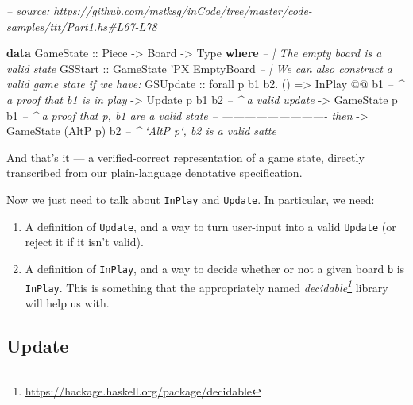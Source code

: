 \documentclass[]{article}
\newenvironment{Shaded}{}{}
\newcommand{\CommentTok}[1]{\textcolor[rgb]{0.38,0.63,0.69}{\textit{#1}}}
\newcommand{\DataTypeTok}[1]{\textcolor[rgb]{0.56,0.13,0.00}{#1}}
\newcommand{\FunctionTok}[1]{\textcolor[rgb]{0.02,0.16,0.49}{#1}}
\newcommand{\KeywordTok}[1]{\textcolor[rgb]{0.00,0.44,0.13}{\textbf{#1}}}
\newcommand{\NormalTok}[1]{#1}
\newcommand{\OtherTok}[1]{\textcolor[rgb]{0.00,0.44,0.13}{#1}}
\renewcommand{\href}[2]{#2\footnote{\url{#1}}}
\begin{document}
\begin{Shaded}
\begin{Highlighting}[]
\CommentTok{-- source: https://github.com/mstksg/inCode/tree/master/code-samples/ttt/Part1.hs#L67-L78}

\KeywordTok{data} \DataTypeTok{GameState}\OtherTok{ ::} \DataTypeTok{Piece} \OtherTok{->} \DataTypeTok{Board} \OtherTok{->} \DataTypeTok{Type} \KeywordTok{where}
    \CommentTok{-- | The empty board is a valid state}
    \DataTypeTok{GSStart}
\OtherTok{        ::} \DataTypeTok{GameState}\NormalTok{ '}\DataTypeTok{PX} \DataTypeTok{EmptyBoard}
    \CommentTok{-- | We can also construct a valid game state if we have:}
    \DataTypeTok{GSUpdate}
\OtherTok{        ::}\NormalTok{ forall p b1 b2}\FunctionTok{.}\NormalTok{ ()}
        \OtherTok{=>} \DataTypeTok{InPlay}          \FunctionTok{@@}\NormalTok{ b1     }\CommentTok{-- ^ a proof that b1 is in play}
        \OtherTok{->} \DataTypeTok{Update}\NormalTok{    p        b1 b2  }\CommentTok{-- ^ a valid update}
        \OtherTok{->} \DataTypeTok{GameState}\NormalTok{ p        b1     }\CommentTok{-- ^ a proof that p, b1 are a valid state}
        \CommentTok{-- ---------------------------- then}
        \OtherTok{->} \DataTypeTok{GameState}\NormalTok{ (}\DataTypeTok{AltP}\NormalTok{ p)    b2  }\CommentTok{-- ^ `AltP p`, b2 is a valid satte}
\end{Highlighting}
\end{Shaded}

And that's it --- a verified-correct representation of a game state, directly
transcribed from our plain-language denotative specification.

Now we just need to talk about \texttt{InPlay} and \texttt{Update}. In
particular, we need:

\begin{enumerate}
\def\labelenumi{\arabic{enumi}.}
\tightlist
\item
  A definition of \texttt{Update}, and a way to turn user-input into a valid
  \texttt{Update} (or reject it if it isn't valid).
\item
  A definition of \texttt{InPlay}, and a way to decide whether or not a given
  board \texttt{b} is \texttt{InPlay}. This is something that the appropriately
  named \emph{\href{https://hackage.haskell.org/package/decidable}{decidable}}
  library will help us with.
\end{enumerate}

\hypertarget{update}{%
\subsection{Update}\label{update}}
\end{document}
